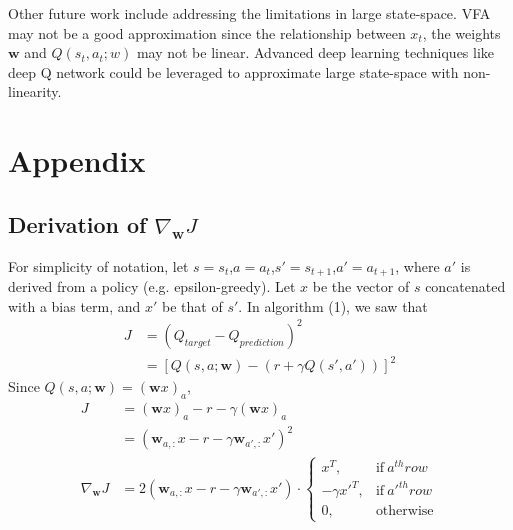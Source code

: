 \documentclass[letterpaper, 10 pt, conference]{ieeeconf}  %
\begin{document}
Other future work include addressing the limitations in large state-space. VFA may not be a good approximation since the relationship between $x_t$, the weights $\textbf{w}$ and $Q(s_t,a_t;\textbf{}w)$ may not be linear. Advanced deep learning techniques like deep Q network could be leveraged to approximate large state-space with non-linearity. 

 
  

\section*{Appendix}
\subsection{Derivation of $\nabla_\textbf{w} J$}
For simplicity of notation, let $s = s_t$,$a = a_t$,$s' = s_{t+1}$,$a' = a_{t+1}$, where $a'$ is derived from a policy (e.g. epsilon-greedy). Let $x$ be the vector of $s$ concatenated with a bias term, and $x'$ be that of $s'$.
In algorithm (1), we saw that
\begin{align*}
    J &= (Q_{target}-Q_{prediction})^2\\
    &= [Q(s,a;\textbf{w})-(r+\gamma Q(s',a'))]^2
\end{align*}
Since $Q(s,a;\textbf{w})=(\textbf{w}x)_a$,
\begin{align*}
    J &= (\textbf{w}x)_a-r-\gamma(\textbf{w}x)_a\\
    &= (\textbf{w}_{a,:} x - r - \gamma \textbf{w}_{a',:}x')^2\\
    \nabla_\textbf{w}J &= 2(\textbf{w}_{a,:} x - r - \gamma \textbf{w}_{a',:}x')\cdot
    \begin{cases}
      x^T, & \text{if}\ a^{th} row \\
      -\gamma x'^T, & \text{if}\ a'^{th} row\\
      0, & \text{otherwise}
    \end{cases}
\end{align*}
\end{document}
